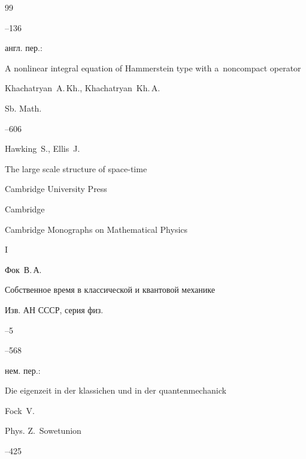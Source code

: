 \begin{thebibliography}{99}


--136

\transl

англ. пер.:~

\paper A nonlinear integral equation of Hammerstein type with a~noncompact operator

\by  Khachatryan~A.\,Kh., Khachatryan~Kh.\,A.

\jour Sb. Math.




--606









\by  Hawking~S.,  Ellis~J.

\book The large scale structure of space-time

\publ Cambridge University Press

\publaddr Cambridge 


\serial Cambridge Monographs on Mathematical Physics

\vol I









\by Фок~В.\,А.

\paper Собственное время в классической и квантовой механике

\jour Изв. АН СССР, серия физ.


--5

--568

\transl нем. пер.:~

\paper Die eigenzeit in der klassichen und in der quantenmechanick

\by Fock~V.

\jour Phys. Z.~Sowetunion




--425








\end{thebibliography}
